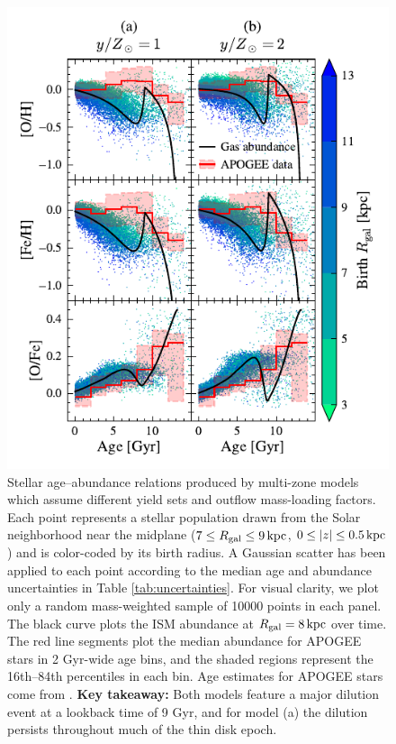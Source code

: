 \documentclass[twocolumn,twocolappendix,linenumbers]{aastex631}
\begin{document}
\begin{figure}
    \centering
    \includegraphics[width=\linewidth]{figures/abundance_evolution_yields.pdf}
    \caption{Stellar age--abundance relations produced by multi-zone models which assume different yield sets and outflow mass-loading factors. Each point represents a stellar population drawn from the Solar neighborhood near the midplane ($7\leq R_{\rm gal}\leq 9\,{\rm kpc}$, $0\leq |z| \leq 0.5\,{\rm kpc}$) and is color-coded by its birth radius. A Gaussian scatter has been applied to each point according to the median age and abundance uncertainties in Table \ref{tab:uncertainties}. For visual clarity, we plot only a random mass-weighted sample of \num{10000} points in each panel. The black curve plots the ISM abundance at $R_{\rm gal}=8\,{\rm kpc}$ over time. The red line segments plot the median abundance for APOGEE stars in {2 Gyr}-wide age bins, and the shaded regions represent the 16th--84th percentiles in each bin. Age estimates for APOGEE stars come from \citet{leung_variational_2023}. {\bf Key takeaway:} Both models feature a major dilution event at a lookback time of 9 Gyr, and for model (a) the dilution persists throughout much of the thin disk epoch.}
    \label{fig:abundance-evolution-yields}
\end{figure}
\end{document}
